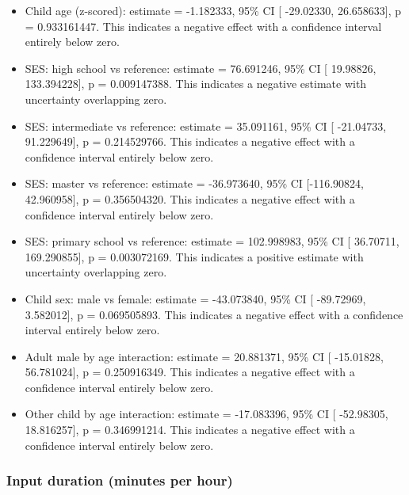 \documentclass[
  letterpaper,
  DIV=11,
  numbers=noendperiod]{scrartcl}
\providecommand{\tightlist}{%
  \setlength{\itemsep}{0pt}\setlength{\parskip}{0pt}}\usepackage{longtable,booktabs,array}
\begin{document}
\begin{itemize}
\tightlist
\item
  Child age (z-scored): estimate = -1.182333, 95\% CI {[} -29.02330,
  26.658633{]}, p = 0.933161447. This indicates a negative effect with a
  confidence interval entirely below zero.
\item
  SES: high school vs reference: estimate = 76.691246, 95\% CI {[}
  19.98826, 133.394228{]}, p = 0.009147388. This indicates a negative
  estimate with uncertainty overlapping zero.
\item
  SES: intermediate vs reference: estimate = 35.091161, 95\% CI {[}
  -21.04733, 91.229649{]}, p = 0.214529766. This indicates a negative
  effect with a confidence interval entirely below zero.
\item
  SES: master vs reference: estimate = -36.973640, 95\% CI
  {[}-116.90824, 42.960958{]}, p = 0.356504320. This indicates a
  negative effect with a confidence interval entirely below zero.
\item
  SES: primary school vs reference: estimate = 102.998983, 95\% CI {[}
  36.70711, 169.290855{]}, p = 0.003072169. This indicates a positive
  estimate with uncertainty overlapping zero.
\item
  Child sex: male vs female: estimate = -43.073840, 95\% CI {[}
  -89.72969, 3.582012{]}, p = 0.069505893. This indicates a negative
  effect with a confidence interval entirely below zero.
\item
  Adult male by age interaction: estimate = 20.881371, 95\% CI {[}
  -15.01828, 56.781024{]}, p = 0.250916349. This indicates a negative
  effect with a confidence interval entirely below zero.
\item
  Other child by age interaction: estimate = -17.083396, 95\% CI {[}
  -52.98305, 18.816257{]}, p = 0.346991214. This indicates a negative
  effect with a confidence interval entirely below zero.
\end{itemize}

\hypertarget{input-duration-minutes-per-hour-1}{%
\subsubsection{Input duration (minutes per
hour)}\label{input-duration-minutes-per-hour-1}}
\end{document}
